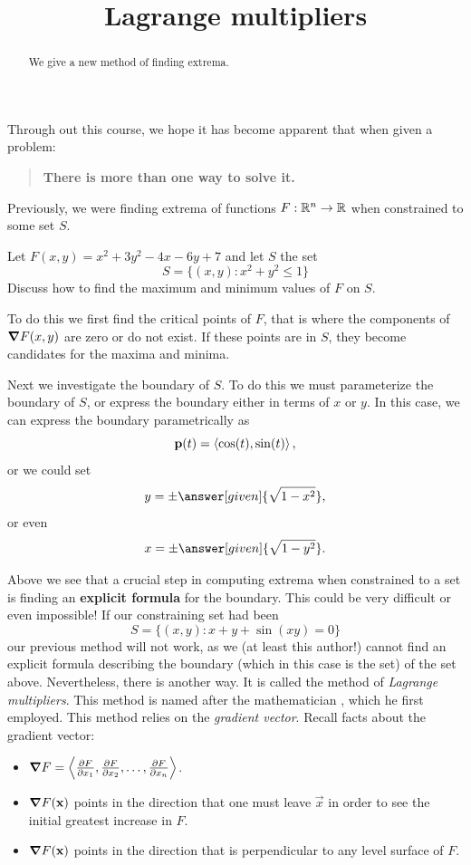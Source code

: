 \documentclass{ximera}
\title[Dig-In:]{Lagrange multipliers}
\begin{document}
\begin{abstract}
  We give a new method of finding extrema. 
\end{abstract}
\maketitle

Through out this course, we hope it has become apparent that when
given a problem:
\begin{quote}
  \textbf{There is more than one way to solve it.}
\end{quote}
Previously, we were finding extrema of functions $F:\R^n\to\R$ when
constrained to some set $S$.

\begin{example}
  Let $F(x,y) = x^2+3y^2-4x-6y+7$ and let $S$ the set
  \[
  S = \{(x,y):x^2 + y^2 \le 1\}
  \]
  Discuss how to find the maximum and minimum values of $F$ on $S$.
  \begin{explanation}
    To do this we first find the critical points of $F$, that is where
    the components of $\grad F(x,y)$ are zero or do not exist. If
    these points are in $S$, they become candidates for the maxima and
    minima.

    Next we investigate the boundary of $S$. To do this we must
    parameterize the boundary of $S$, or express the boundary either in
    terms of $x$ or $y$. In this case, we can express the boundary
    parametrically as
    \[
    \vec{p}(t) = \vector{\cos(t),\sin(t)},
    \]
    or we could set
    \[
    y = \pm \answer[given]{\sqrt{1-x^2}},
    \]
    or even
    \[
    x = \pm \answer[given]{\sqrt{1-y^2}}.
    \]
  \end{explanation}
\end{example}

Above we see that a crucial step in computing extrema when constrained
to a set is finding an \textbf{explicit formula} for the boundary. This
could be very difficult or even impossible! If our constraining set had been
\[
S = \{(x,y): x+y+\sin(xy) =0\}
\]
our previous method will not work, as we (at least this author!)
cannot find an explicit formula describing the boundary (which in this
case is the set) of the set above. Nevertheless, there is another
way. It is called the method of \textit{Lagrange multipliers}. This
method is named after the mathematician , which
he first employed. This method relies on the \textit{gradient
  vector}. Recall facts about the gradient vector:
\begin{itemize}
\item $\grad F = \vector{\pp[F]{x_1},\pp[F]{x_2},\dots,\pp[F]{x_n}}$.
\item $\grad F(\vec{x})$ points in the direction that one must leave
  $\vec{x}$ in order to see the initial greatest increase in $F$.
\item $\grad F(\vec{x})$ points in the direction that is perpendicular
  to any level surface of $F$.
\end{itemize}
\end{document}
